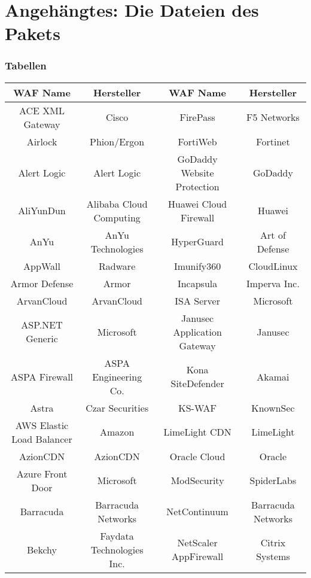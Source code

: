 

\chapter{Angehängtes: Die Dateien des Pakets}

\subsection*{Tabellen}

\begin{table}[h]
    \centering
    \begin{tabular}{|c | c | c | c |} 
 \hline
      \textbf{WAF Name} & \textbf{Hersteller} & \textbf{WAF Name} & \textbf{Hersteller} \\
      \hline
      ACE XML Gateway & Cisco & FirePass & F5 Networks\\
      Airlock & Phion/Ergon & FortiWeb & Fortinet\\
      Alert Logic & Alert Logic & GoDaddy Website Protection & GoDaddy\\
      AliYunDun & Alibaba Cloud Computing & Huawei Cloud Firewall & Huawei\\
      AnYu & AnYu Technologies & HyperGuard & Art of Defense\\
      AppWall & Radware & Imunify360 & CloudLinux\\
      Armor Defense & Armor & Incapsula & Imperva Inc.\\
      ArvanCloud & ArvanCloud & ISA Server & Microsoft\\
      ASP.NET Generic & Microsoft & Janusec Application Gateway & Janusec\\
      ASPA Firewall & ASPA Engineering Co. & Kona SiteDefender & Akamai\\
      Astra & Czar Securities & KS-WAF & KnownSec\\
      AWS Elastic Load Balancer & Amazon & LimeLight CDN & LimeLight\\
      AzionCDN & AzionCDN & Oracle Cloud & Oracle\\
      Azure Front Door & Microsoft & ModSecurity & SpiderLabs\\
      Barracuda & Barracuda Networks & NetContinuum & Barracuda Networks\\
      Bekchy & Faydata Technologies Inc. & NetScaler AppFirewall & Citrix Systems\\

\end{tabular}
\end{table}
